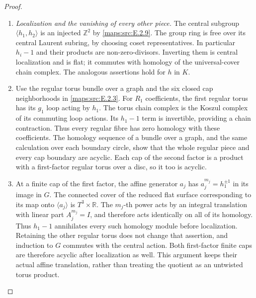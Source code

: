 \begin{proof}
\begin{enumerate}[label=\arabic*.,leftmargin=*]
\item \emph{Localization and the vanishing of every other piece.}
The central subgroup $\langle h_1,h_2\rangle$ is an injected
$\mathbb Z^2$ by \ref{maps:src:E.2.9}. The group ring is free over its central
Laurent subring, by choosing coset representatives. In particular
$h_i-1$ and their products are non-zero-divisors. Inverting them
is central localization and is flat; it commutes with homology
of the universal-cover chain complex. The analogous assertions
hold for $h$ in $K$.

\item Use the regular torus bundle over a graph and the six closed
cap neighborhoods in \ref{maps:src:E.2.3}. For $R_1$ coefficients, the first
regular torus has its $g_1$ loop acting by $h_1$. The torus
chain complex is the Koszul complex of its commuting loop
actions. Its $h_1-1$ term is invertible, providing a chain
contraction. Thus every regular fibre has zero homology with
these coefficients. The homology sequence of a bundle over
a graph, and the same calculation over each boundary circle,
show that the whole regular piece and every cap boundary are
acyclic. Each cap of the second factor is a product with a
first-factor regular torus over a disc, so it too is acyclic.

\item At a finite cap of the first factor, the affine generator
$a_j$ has $a_j^{m_j}=h_1^{\pm1}$ in its image in $G$.
The connected cover of the reduced flat surface corresponding
to its map onto $\langle a_j\rangle$ is $T^3\times\mathbb R$.
The $m_j$-th power acts by an integral translation with linear
part $A_j^{m_j}=I$, and therefore acts identically on all of
its homology. Thus $h_1-1$ annihilates every such homology
module before localization. Retaining the other regular torus
does not change that assertion, and induction to $G$ commutes
with the central action. Both first-factor finite caps are
therefore acyclic after localization as well. This argument
keeps their actual affine translation, rather than treating
the quotient as an untwisted torus product.


\end{enumerate}
\end{proof}

